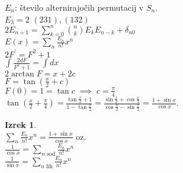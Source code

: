 \documentclass[a4paper, 12pt]{book}
\theoremstyle{definition}
\newtheorem{theorem}[counter]{Izrek}
\theoremstyle{remark}
\begin{document}
$E_n$: število alternirajočih permutacij v $S_n$. \\
$E_3 = 2$ $(231), (132)$ \\
$2 E_{n+1} = \sum_{k=0}^{n} \binom{n}{k} E_k E_{n-k} + \delta_{n0}$ \\
$E(x) = \sum_n \frac{E_n}{n!} x^n$ \\
$2 F^{'} = F^2 + 1$ \\
$\int \frac{2dF}{F^2 + 1} = \int dx$ \\
$2 \arctan F = x + 2c$ \\
$F = \tan \left(\frac{x}{2} + c \right)$ \\
$F(0) = 1 = \tan c \; \implies \; c = \frac{\pi}{4}$ \\
$\tan \left(\frac{x}{2} + \frac{\pi}{4}\right) = \frac{\tan \frac{x}{2} + 1}{1 - \tan \frac{x}{2}}
= \frac{\sin \frac{x}{2} + \cos \frac{x}{2}}{\cos \frac{x}{2} - \sin \frac{x}{2}} = \frac{1 + \sin x}{\cos x}$.
\begin{theorem} \text{} \\
  $\sum_n \frac{E_n}{n!} x^n = \frac{1 + \sin x}{\cos x}$ oz. \\
  $\frac{1}{\cos x} = \sum_{n \text{ sod}} \frac{E_n}{n!} x^n$ \\
  $\frac{1}{\sin x} = \sum_{n \text{ lih}} \frac{E_n}{n!} x^n$ \\
\end{theorem}
\end{document}
